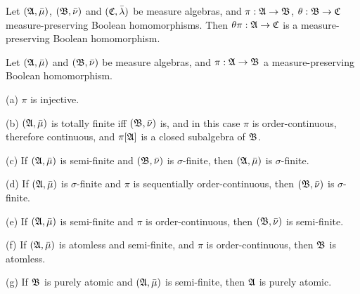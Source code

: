  Let $(\frak A,\bar\mu)$, $(\frak B,\bar\nu)$
and $(\frak C,\bar\lambda)$ be measure algebras, and
$\pi:\frak A\to\frak B$,
$\theta:\frak B\to\frak C$ measure-preserving Boolean homomorphisms.
Then $\theta\pi:\frak A\to\frak C$ is a measure-preserving Boolean
homomorphism.
     
     
 Let $(\frak A,\bar\mu)$ and
$(\frak B,\bar\nu)$ be measure algebras, and $\pi:\frak A\to\frak B$ a
measure-preserving Boolean homomorphism.
     
(a) $\pi$ is injective.
     
(b) $(\frak A,\bar\mu)$ is totally finite iff $(\frak B,\bar\nu)$ is,
and in this case $\pi$ is
order-continuous, therefore continuous, and $\pi[\frak A]$ is a closed
subalgebra of $\frak B$.
     
(c) If $(\frak A,\bar\mu)$ is semi-finite and $(\frak B,\bar\nu)$ is
$\sigma$-finite, then $(\frak A,\bar\mu)$ is $\sigma$-finite.
     
(d) If $(\frak A,\bar\mu)$ is $\sigma$-finite and $\pi$ is sequentially
order-continuous, then $(\frak B,\bar\nu)$ is $\sigma$-finite.
     
(e) If $(\frak A,\bar\mu)$ is semi-finite and $\pi$ is
order-continuous, then $(\frak B,\bar\nu)$ is semi-finite.
     
(f) If $(\frak A,\bar\mu)$ is atomless and semi-finite, and $\pi$ is
order-continuous, then $\frak B$ is atomless.
     
(g) If $\frak B$ is purely atomic and $(\frak A,\bar\mu)$ is
semi-finite, then $\frak A$ is purely atomic.
     
